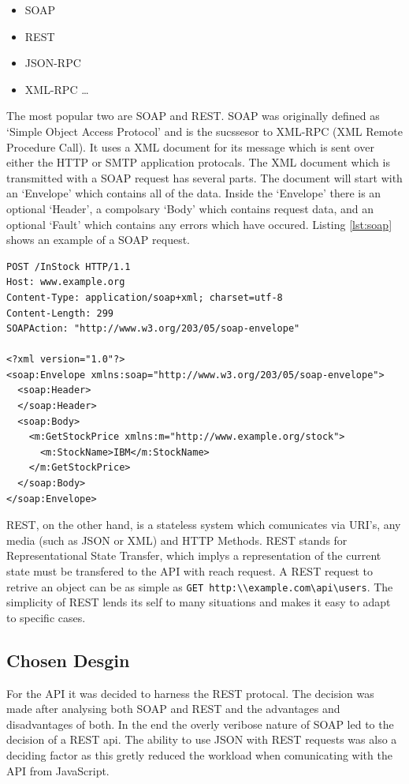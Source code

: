 \documentclass[11pt,a4paper]{report}
\begin{document}
\begin{itemize}
\item SOAP
\item REST
\item JSON-RPC 
\item XML-RPC \ldots
\end{itemize}

The most popular two are SOAP and REST. SOAP was originally defined as `Simple Object Access Protocol' and is the sucssesor to XML-RPC (XML Remote Procedure Call). It uses a XML document for its message which is sent over either the HTTP or SMTP application protocals. The XML document which is transmitted with a SOAP request has several parts. The document will start with an `Envelope' which contains all of the data. Inside the `Envelope' there is an optional `Header', a compolsary `Body' which contains request data, and an optional `Fault' which contains any errors which have occured. Listing \ref{lst:soap} shows an example of a SOAP request.


\begin{lstlisting}[captionpos=b, caption=An example SOAP request., label=lst:soap, frame=single]
POST /InStock HTTP/1.1
Host: www.example.org
Content-Type: application/soap+xml; charset=utf-8
Content-Length: 299
SOAPAction: "http://www.w3.org/203/05/soap-envelope"
 
<?xml version="1.0"?>
<soap:Envelope xmlns:soap="http://www.w3.org/203/05/soap-envelope">
  <soap:Header>
  </soap:Header>
  <soap:Body>
    <m:GetStockPrice xmlns:m="http://www.example.org/stock">
      <m:StockName>IBM</m:StockName>
    </m:GetStockPrice>
  </soap:Body>
</soap:Envelope>
\end{lstlisting}

REST, on the other hand, is a stateless system which comunicates via URI's, any media (such as JSON or XML) and HTTP Methods. REST stands for Representational State Transfer, which implys a representation of the current state must be transfered to the API with reach request. A REST request to retrive an object can be as simple as \lstinline$GET http:\\example.com\api\users$. The simplicity of REST lends its self to many situations and makes it easy to adapt to specific cases. 

\subsection{Chosen Desgin}
For the API it was decided to harness the REST protocal. The decision was made after analysing both SOAP and REST and the advantages and disadvantages of both. In the end the overly veribose nature of SOAP led to the decision of a REST api.  The ability to use JSON with REST requests was also a deciding factor as this gretly reduced the workload when comunicating with the API from JavaScript. 
\end{document}
